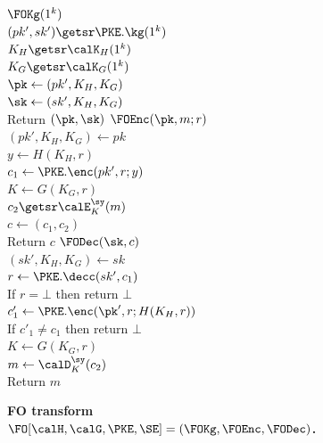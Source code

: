 \ifnum{}
\begin{figure}[t]
    {\underline{$\FOKg(1^k)$}\\
    $(pk',sk') \getsr \PKE.\kg(1^k)$ \\
    $K_H \getsr \calK_H(1^k)$\\
    $K_G \getsr \calK_G(1^k)$\\
    $\pk \gets (pk',K_H,K_G)$ \\
    $\sk \gets (sk',K_H,K_G)$ \\
    Return $(\pk,\sk)$ 
}{
    \underline{$\FOEnc(\pk,m;r)$} \\
    $(pk', K_H, K_G) \gets pk$\\
    $y \gets H(K_H,r)$\\
    $c_1 \gets \PKE.\enc(pk',r;y)$\\
    $K \gets G(K_G,r)$\\
    $c_2 \getsr \calE^{\sy}_K(m)$\\
    $c \gets (c_1,c_2)$\\
    Return $c$
}{
    \underline{$\FODec(\sk,c)$} \\
    $(sk', K_H, K_G) \gets sk$\\
    $r \gets \PKE.\decc(sk',c_1)$ \\
    If $r=\bot$ then return $\bot$\\
    $c_1' \gets \PKE.\enc(\pk',r;H(K_H,r))$\\
    If $c'_1 \neq c_1$ then return $\bot$\\
    $K \gets G(K_G,r)$\\
    $m  \gets \calD^{\sy}_K(c_2)$ \\
    Return $m$ \vspace{0.5ex}
    }
\caption{\textbf{FO transform $\FO[\calH,\calG,\PKE,\SE] = (\FOKg, \FOEnc, \FODec)$.}}
\label{fig:fo-scheme}
\end{figure}
\else 
